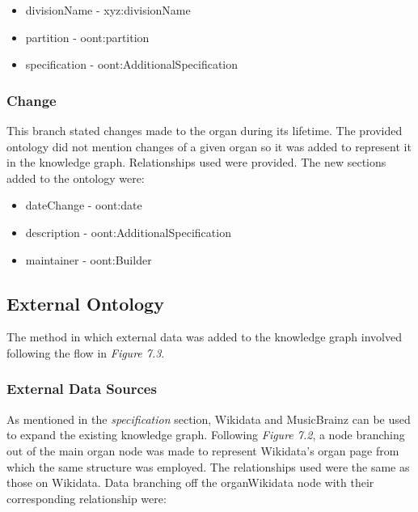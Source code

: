 \vspace{-0.1cm}
\begin{itemize}
    \itemsep0em 
    \item divisionName - xyz:divisionName
    \vspace{-0.05cm}
    \item partition - oont:partition
    \vspace{-0.05cm}
    \item specification - oont:AdditionalSpecification
\end{itemize}

\subsubsection{Change}
\hspace*{0.5cm} This branch stated changes made to the organ during its lifetime. The provided ontology did not mention changes of a given organ so it was added to represent it in the knowledge graph. Relationships used were provided. The new sections added to the ontology were:

\vspace{-0.15cm}
\begin{itemize}
    \itemsep0em 
    \item dateChange - oont:date 
    \vspace{-0.05cm}
    \item description - oont:AdditionalSpecification
    \vspace{-0.05cm}
    \item maintainer - oont:Builder
\end{itemize}
\vspace{-0.25cm}

\subsection{External Ontology}
\hspace*{0.5cm} The method in which external data was added to the knowledge graph involved following the flow in \textit{Figure 7.3}.

\subsubsection{External Data Sources}
\hspace*{0.5cm} As mentioned in the \textit{specification} section, Wikidata and MusicBrainz can be used to expand the existing knowledge graph. Following \textit{Figure 7.2}, a node branching out of the main organ node was made to represent Wikidata's organ page \cite{organwikidata} from which the same structure was employed. The relationships used were the same as those on Wikidata. Data branching off the organWikidata node with their corresponding relationship were:

